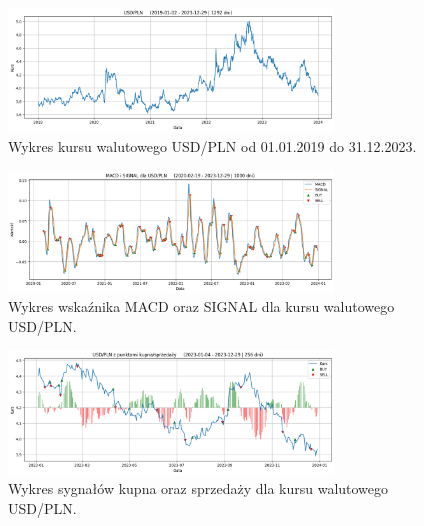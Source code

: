 \documentclass[12pt, a4paper]{article}
\begin{document}
\begin{figure}[ht]
    \centering
    \includegraphics[width=0.77\textwidth]{usd_pln_value.png}
    \caption{Wykres kursu walutowego USD/PLN od 01.01.2019 do 31.12.2023.}
    \label{fig:all:usd_pln_value}
\end{figure}
\begin{figure}[ht]
    \centering
    \includegraphics[width=0.77\textwidth]{usd_pln_macd_signal.png}
    \caption{Wykres wskaźnika MACD oraz SIGNAL dla kursu walutowego USD/PLN.}
    \label{fig:all:usd_pln_macd_signal}
\end{figure}
\begin{figure}[ht]
    \centering
    \includegraphics[width=0.77\textwidth]{usd_pln_value_buy_sell.png}
    \caption{Wykres sygnałów kupna oraz sprzedaży dla kursu walutowego USD/PLN.}
    \label{fig:all:usd_pln_value_buy_sell}
\end{figure}
\end{document}
